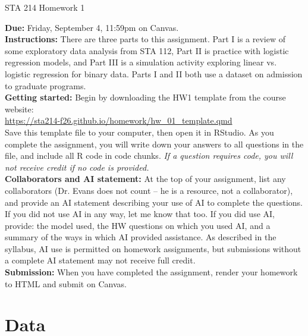 \documentclass[11pt]{article}
\begin{document}
\begin{center}
\Large
STA 214 Homework 1\\
\normalsize
\vspace{5mm}
\end{center}

\noindent \textbf{Due:} Friday, September 4, 11:59pm on Canvas.\\ 

\noindent \textbf{Instructions:} There are three parts to this assignment. Part I is a review of some exploratory data analysis from STA 112, Part II is practice with logistic regression models, and Part III is a simulation activity exploring linear vs. logistic regression for binary data. Parts I and II both use a dataset on admission to graduate programs.\\

\noindent \textbf{Getting started:} Begin by downloading the HW1 template from the course website:\\

\url{https://sta214-f26.github.io/homework/hw_01_template.qmd}\\

\noindent Save this template file to your computer, then open it in RStudio. As you complete the assignment, you will write down your answers to all questions in the file, and include all R code in code chunks. \textit{If a question requires code, you will not receive credit if no code is provided.}\\

\noindent \textbf{Collaborators and AI statement:} At the top of your assignment, list any collaborators (Dr. Evans does not count -- he is a resource, not a collaborator), and provide an AI statement describing your use of AI to complete the questions. If you did not use AI in any way, let me know that too. If you did use AI, provide: the model used, the HW questions on which you used AI, and a summary of the ways in which AI provided assistance. As described in the syllabus, AI use is permitted on homework assignments, but submissions without a complete AI statement may not receive full credit.\\

\noindent \textbf{Submission:} When you have completed the assignment, render your homework to HTML and submit on Canvas.

\section*{Data}
\end{document}
